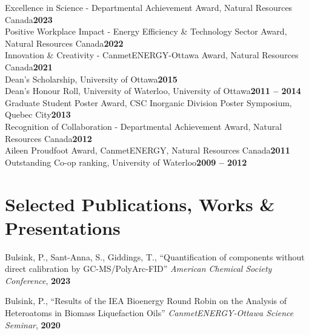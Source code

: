 \documentclass[margin,line]{resumecls}
\begin{document}
\begin{resume}
    Excellence in Science - Departmental Achievement Award,  Natural Resources Canada\hfill\textbf{2023}\vspace{1mm}\\%
    Positive Workplace Impact - Energy Efficiency \& Technology Sector Award, Natural Resources Canada\hfill\textbf{2022}\vspace{1mm}\\%
    Innovation \& Creativity - CanmetENERGY-Ottawa Award, Natural Resources Canada\hfill\textbf{2021}\vspace{1mm}\\%
    Dean's Scholarship, University of Ottawa\hfill\textbf{2015}\vspace{1mm}\\%
    Dean's Honour Roll, University of Waterloo, University of Ottawa\hfill\textbf{2011 -- 2014}\vspace{1mm}\\%
    Graduate Student Poster Award, CSC Inorganic Division Poster Symposium, Quebec City\hfill\textbf{2013}\vspace{1mm}\\%
    Recognition of Collaboration - Departmental Achievement Award, Natural Resources Canada\hfill\textbf{2012}\vspace{1mm}\\%
    Aileen Proudfoot Award, CanmetENERGY, Natural Resources Canada\hfill\textbf{2011}\vspace{1mm}\\%
    Outstanding Co-op ranking, University of Waterloo\hfill\textbf{2009 -- 2012}\vspace{1mm}%


    \section{\mysidestyle Selected Publications, Works \& Presentations}
    Bulsink, P., Sant-Anna, S., Giddings, T., ``Quantification of components without direct calibration by GC-MS/PolyArc\textsuperscript \textregistered-FID'' \textit{American Chemical Society Conference}, \textbf{2023}

    \vspace{0mm}
    Bulsink, P., ``Results of the IEA Bioenergy Round Robin on the Analysis of Heteroatoms in Biomass Liquefaction Oils'' \textit{CanmetENERGY-Ottawa Science Seminar}, \textbf{2020}


\end{resume}
\end{document}
